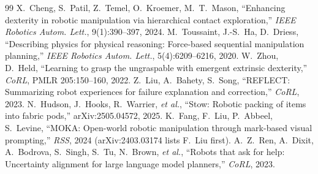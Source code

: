\documentclass[10pt,twocolumn]{article}
\begin{document}
{\begin{thebibliography}{99}
 X.~Cheng, S.~Patil, Z.~Temel, O.~Kroemer, M.~T.~Mason, ``Enhancing dexterity in robotic manipulation via hierarchical contact exploration,'' \emph{IEEE Robotics Autom. Lett.}, 9(1):390--397, 2024.
 M.~Toussaint, J.-S.~Ha, D.~Driess, ``Describing physics for physical reasoning: Force-based sequential manipulation planning,'' \emph{IEEE Robotics Autom. Lett.}, 5(4):6209--6216, 2020.
 W.~Zhou, D.~Held, ``Learning to grasp the ungraspable with emergent extrinsic dexterity,'' \emph{CoRL}, PMLR 205:150--160, 2022.
 Z.~Liu, A.~Bahety, S.~Song, ``REFLECT: Summarizing robot experiences for failure explanation and correction,'' \emph{CoRL}, 2023.
 N.~Hudson, J.~Hooks, R.~Warrier, \emph{et al.}, ``Stow: Robotic packing of items into fabric pods,'' arXiv:2505.04572, 2025.
 K.~Fang, F.~Liu, P.~Abbeel, S.~Levine, ``MOKA: Open-world robotic manipulation through mark-based visual prompting,'' \emph{RSS}, 2024 (arXiv:2403.03174 lists F.~Liu first).
 A.~Z.~Ren, A.~Dixit, A.~Bodrova, S.~Singh, S.~Tu, N.~Brown, \emph{et al.}, ``Robots that ask for help: Uncertainty alignment for large language model planners,'' \emph{CoRL}, 2023.
\end{thebibliography}}
\end{document}
